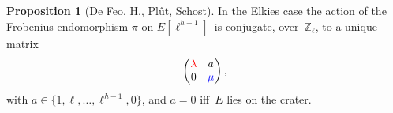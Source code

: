 \documentclass[10pt,a4paper]{beamer}
\theoremstyle{plain}
\theoremstyle{definition}
\theoremstyle{definition}
\theoremstyle{definition}
\newtheorem{prop}[thm]{Proposition}
\theoremstyle{definition}
\theoremstyle{remark}
\theoremstyle{remark}
\begin{document}
%


\begin{frame}

\begin{prop}[De Feo, H., Pl\^ut, Schost]\label{prop:matrice-Frobenius}
In the Elkies case the action of the Frobenius endomorphism $\pi$ on $E[\ell^{h+1}]$~is conjugate, over~$\mathbb{Z}_{\ell}$,
to a unique matrix \[\left ( \begin{matrix}{\color{red}\lambda} & a\\ 0 &
{\color{blue}\mu} \end{matrix}\right ), \]  with $a \in \{ 1,\ell, \dots,
\ell^{h-1}, 0  \}$, and $a = 0$ iff~$E$ lies on the crater.

\end{prop}

\begin{figure}
\begin{center}


\end{center}
\end{figure}
\end{frame}
\end{document}
